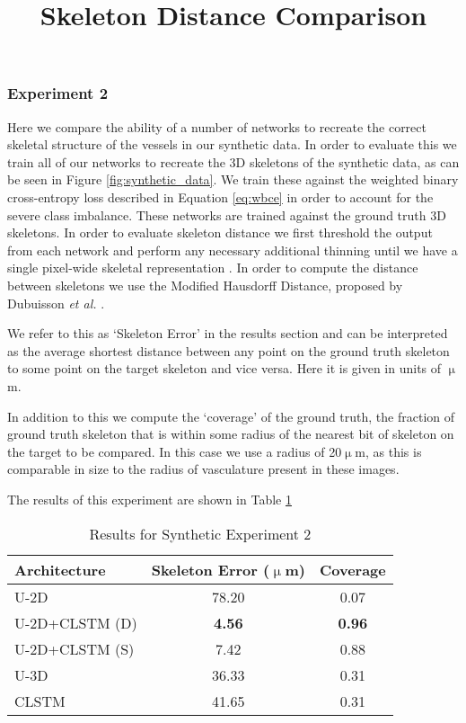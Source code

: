 \documentclass[journal,transmag]{IEEEtran}
\begin{document}
\subsubsection*{Experiment 2}
Here we compare the ability of a number of networks to recreate the correct skeletal structure of the vessels in our synthetic data. In order to evaluate this we train all of our networks to recreate the 3D skeletons of the synthetic data, as can be seen in Figure \ref{fig:synthetic_data}. We train these against the weighted binary cross-entropy loss described in Equation \ref{eq:wbce} in order to account for the severe class imbalance. These networks are trained against the ground truth 3D skeletons. In order to evaluate skeleton distance we first threshold the output from each network and perform any necessary additional thinning until we have a single pixel-wide skeletal representation \cite{Pudney1998}. In order to compute the distance between skeletons we use the Modified Hausdorff Distance, proposed by Dubuisson \emph{et al.} \cite{Dubuisson1994}. 


We refer to this as `Skeleton Error' in the results section and can be interpreted as the average shortest distance between any point on the ground truth skeleton to some point on the target skeleton and vice versa. Here it is given in units of $\upmu$m. 

In addition to this we compute the `coverage' of the ground truth, the fraction of ground truth skeleton that is within some radius of the nearest bit of skeleton on the target to be compared. In this case we use a radius of 20$\upmu$m, as this is comparable in size to the radius of vasculature present in these images. 

The results of this experiment are shown in Table \ref{tab:synth_skel_haus}

\begin{table}[h]
\title{Skeleton Distance Comparison}
\centering
\begin{tabular}{l|c|c}
Architecture & Skeleton Error ($\upmu$m)  & Coverage \\ 
\hline
U-2D & 78.20 & 0.07 \\
U-2D+CLSTM (D) & \textbf{4.56}  & \textbf{0.96} \\
U-2D+CLSTM (S) & 7.42  & 0.88 \\
U-3D &  36.33  & 0.31 \\
CLSTM & 41.65  & 0.31 \\
\end{tabular}
\caption{Results for Synthetic Experiment 2}
\label{tab:synth_skel_haus}
\end{table}
\end{document}
